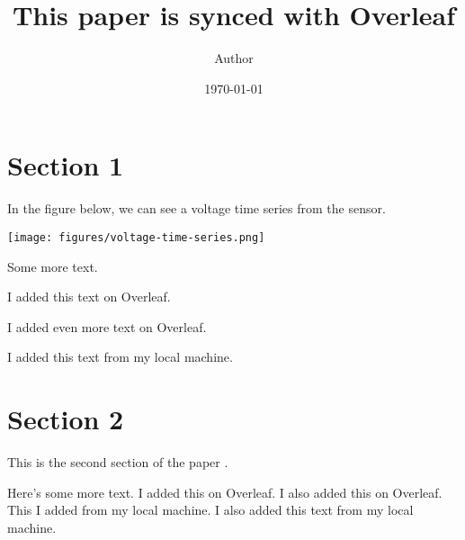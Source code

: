 \documentclass[11pt]{article}
\title{This paper is synced with Overleaf}
\author{ Author }
\date{\today}
\begin{document}
\maketitle
\pagebreak



\section{Section 1}

In the figure below,
we can see a voltage time series from the sensor.

\texttt{[image: figures/voltage-time-series.png]}

Some more text.

I added this text on Overleaf.

I added even more text on Overleaf.

I added this text from my local machine.

\pagebreak
\section{Section 2}

This is the second section of the paper \cite{AbramowitzStegun1970}.

Here's some more text.
I added this on Overleaf.
I also added this on Overleaf.
This I added from my local machine.
I also added this text from my local machine.




\end{document}
